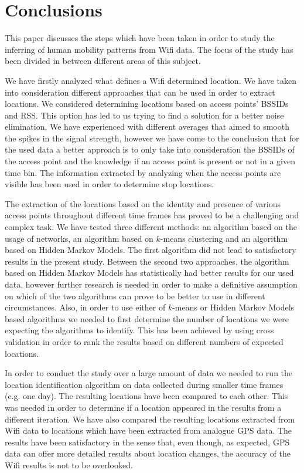 \chapter{Conclusions}

This paper discusses the steps which have been taken in order to study the
inferring of human mobility patterns from Wifi data. The focus of the study has
been divided in between different areas of this subject. 

We have firstly analyzed what defines a Wifi determined location. We have taken
into consideration different approaches that can be used in order to extract
locations. We considered determining locations based on access points' BSSIDs
and RSS. This option has led to us trying to find a solution for a better noise
elimination. We have experienced with different averages that aimed to smooth
the spikes in the signal strength, however we have come to the conclusion that
for the used data a better approach is to only take into consideration the
BSSIDs of the access point and the knowledge if an access point is present or
not in a given time bin. The information extracted by analyzing when the access
points are visible has been used in order to determine stop locations.

The extraction of the locations based on the identity and presence of various
access points throughout different time frames has proved to be a challenging
and complex task. We have tested three different methods: an algorithm based on
the usage of networks, an algorithm based on $k$-means clustering and an
algorithm based on Hidden Markov Models. The first algorithm did not lead to
satisfactory results in the present study. Between the second two approaches,
the algorithm based on Hidden Markov Models has statistically had better results
for our used data, however further research is needed in order to make a
definitive assumption on which of the two algorithms can prove to be better to
use in different circumstances. Also, in order to use either of $k$-means or
Hidden Markov Models based algorithms we needed to first determine the number of
locations we were expecting the algorithms to identify. This has been achieved
by using cross validation in order to rank the results based on different
numbers of expected locations.

In order to conduct the study over a large amount of data we needed to run the
location identification algorithm on data collected during smaller time frames
(e.g. one day). The resulting locations have been compared to each other. This
was needed in order to determine if a location appeared in the results from a
different iteration. We have also compared the resulting locations extracted
from Wifi data to locations which have been extracted from analogue GPS data.
The results have been satisfactory in the sense that, even though, as expected,
GPS data can offer more detailed results about location changes, the accuracy
of the Wifi results is not to be overlooked.

